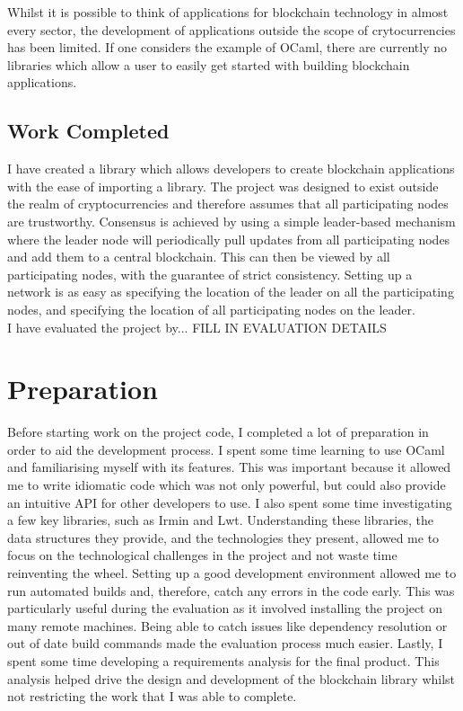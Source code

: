 \documentclass[12pt,a4paper,twoside,openright]{report}
\begin{document}
	Whilst it is possible to think of applications for blockchain technology in almost every sector, the development of applications outside the scope of crytocurrencies has been limited. 
	If one considers the example of OCaml, there are currently no libraries which allow a user to easily get started with building blockchain applications. \\

	\section{Work Completed}
	I have created a library which allows developers to create blockchain applications with the ease of importing a library.
	The project was designed to exist outside the realm of cryptocurrencies and therefore assumes that all participating nodes are trustworthy.
	Consensus is achieved by using a simple leader-based mechanism where the leader node will periodically pull updates from all participating nodes and add them to a central blockchain.
	This can then be viewed by all participating nodes, with the guarantee of strict consistency.
	Setting up a network is as easy as specifying the location of the leader on all the participating nodes, and specifying the location of all participating nodes on the leader.\\
	
	I have evaluated the project by... FILL IN EVALUATION DETAILS

	\chapter{Preparation}
	Before starting work on the project code, I completed a lot of preparation in order to aid the development process.
	I spent some time learning to use OCaml and familiarising myself with its features.
	This was important because it allowed me to write idiomatic code which was not only powerful, but could also provide an intuitive API for other developers to use.
	I also spent some time investigating a few key libraries, such as Irmin and Lwt.
	Understanding these libraries, the data structures they provide, and the technologies they present, allowed me to focus on the technological challenges in the project and not waste time reinventing the wheel. 
	Setting up a good development environment allowed me to run automated builds and, therefore, catch any errors in the code early.
	This was particularly useful during the evaluation as it involved installing the project on many remote machines.
	Being able to catch issues like dependency resolution or out of date build commands made the evaluation process much easier.
	Lastly, I spent some time developing a requirements analysis for the final product. 
	This analysis helped drive the design and development of the blockchain library whilst not restricting the work that I was able to complete.
\end{document}
